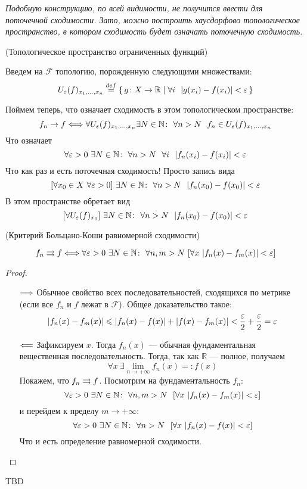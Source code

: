 \textit{Подобную конструкцию, по всей видимости, не получится ввести для
поточечной сходимости. Зато, можно построить хаусдорфово топологическое
пространство, в котором сходимость будет означать поточечную сходимость.}
\begin{present}(Топологическое пространство ограниченных функций)

    Введем на $\mathcal{F}$ топологию, порожденную следующими множествами:
\[
    U_{\varepsilon}(f)_{x_1, \ldots, x_n} \overset{def}{\underset{}{=}}
    \{\, g \colon X \to \mathbb{R} \mid \forall i~~ |g(x_i) - f(x_i)| < \varepsilon \,\}
\]
    Поймем теперь, что означает сходимость в этом топологическом пространстве:
\[
        f_n \to f \Longleftrightarrow \forall U_{\varepsilon}(f)_{x_1, \ldots, x_n} \exists N \in
        \mathbb{N}\colon~ \forall n > N~~ f_n \in U_{\varepsilon}(f)_{x_1, \ldots, x_n}
\]
    Что означает
\[
    \forall \varepsilon > 0~ \exists N \in \mathbb{N}\colon~ \forall n > N~~ \forall i~~
    |f_n(x_i) - f(x_i)| < \varepsilon
\]
    Что как раз и есть поточечная сходимость! Просто запись вида
\[
    [\forall x_0 \in X~ \forall \varepsilon > 0]~ \exists N \in \mathbb{N}\colon~ \forall
    n > N~~ |f_n(x_0) - f(x_0)| < \varepsilon
\]
    В этом пространстве обретает вид
\[
    [\forall U_{\varepsilon}(f)_{x_0}]~ \exists N \in \mathbb{N}\colon~ \forall
    n > N~~ |f_n(x_0) - f(x_0)| < \varepsilon
\]
\end{present}

\begin{theorem}(Критерий Больцано-Коши равномерной сходимости)

\[
    f_n \rightrightarrows f \Longleftrightarrow \forall \varepsilon > 0~ \exists N \in \mathbb{N}\colon~
    \forall n, m > N~ [\forall x~ |f_n(x) - f_m(x)| < \varepsilon]
\]
\end{theorem}
\begin{proof}
    \enewline
    \begin{itemize}
        \item[$\Longrightarrow$] Обычное свойство всех последовательностей, сходящихся по
        метрике (если все $f_n$ и $f$ лежат в $\mathcal{F}$). Общее
        доказательство такое:
\[
            |f_n(x) - f_m(x)| \leqslant |f_n(x) - f(x)| + |f(x) - f_m(x)| <
            \frac{\varepsilon}{2} + \frac{\varepsilon}{2} = \varepsilon
\]

        \item[$\Longleftarrow$] Зафиксируем $x$. Тогда $f_n(x)$ --- обычная фундаментальная
        вещественная последовательность. Тогда, так как $\mathbb{R}$ --- полное,
        получаем
\[
        \forall x~ \exists \lim_{n \to +\infty}f_n(x) =: f(x)
\]
        Покажем, что $f_n \rightrightarrows f$. Посмотрим на фундаментальность $f_n$:
\[
        \forall \varepsilon > 0~ \exists N \in \mathbb{N}\colon~ \forall n, m > N~~
        [\forall x~ |f_n(x) - f_m(x)| < \varepsilon]
\]
        и перейдем к пределу $m \to +\infty$:
\[
        \forall \varepsilon > 0~ \exists N \in \mathbb{N}\colon~ \forall n > N~~
        [\forall x~ |f_n(x) - f(x)| < \varepsilon]
\]
        Что и есть определение равномерной сходимости.
    \end{itemize}
\end{proof}

\begin{examples}
    TBD
\end{examples}
